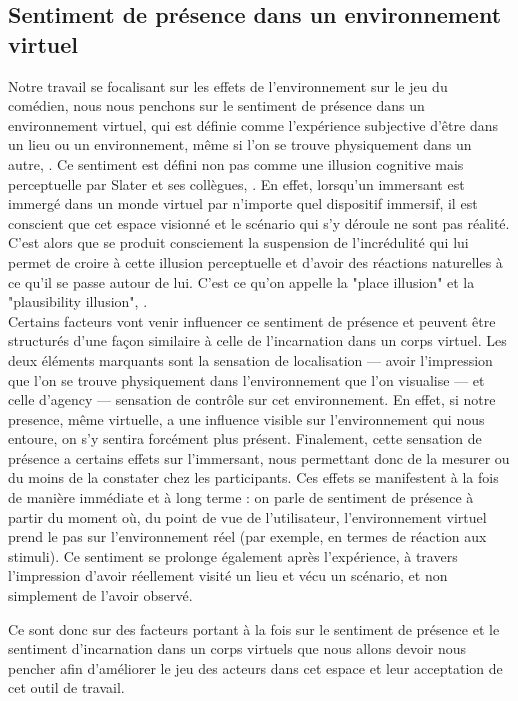\subsection{Sentiment de présence dans un environnement virtuel}
Notre travail se focalisant sur les effets de l'environnement sur le jeu du comédien, nous nous penchons sur le 
sentiment de présence dans un environnement virtuel, qui est définie comme l'expérience subjective d'être dans un lieu ou un environnement, 
même si l’on se trouve physiquement dans un autre, \cite{WitmerSinger1998PresenceQuestionnaire}.
Ce sentiment est défini non pas comme une illusion cognitive mais perceptuelle par 
Slater et ses collègues, \cite{Slater2018Immersion}. En effet, lorsqu'un immersant est immergé dans un monde virtuel
par n'importe quel dispositif immersif, il est conscient que cet espace visionné et le scénario qui s'y 
déroule ne sont pas réalité. C'est alors 
que se produit consciement la suspension de l'incrédulité qui lui permet de croire à cette illusion perceptuelle
et d'avoir des réactions naturelles à ce qu'il se passe autour de lui. C'est ce qu'on 
appelle la "place illusion" et la "plausibility illusion", \cite{Slater2009PlaceIllusion}. \\
Certains facteurs vont venir influencer ce sentiment de présence et peuvent être structurés d'une façon similaire à celle
de l'incarnation dans un corps virtuel. Les deux éléments marquants sont la sensation de localisation --- avoir l’impression que l’on
se trouve physiquement dans l’environnement que l’on visualise --- et celle d’agency --- sensation de contrôle
sur cet environnement. En effet, si notre presence, même virtuelle, a une influence visible sur l’environnement qui nous entoure,
on s’y sentira forcément plus présent. 
Finalement, cette sensation de présence a certains effets sur l'immersant, nous permettant donc de la mesurer ou du 
moins de la constater chez les participants. Ces effets se manifestent à la fois de manière immédiate et à long terme : on parle 
de sentiment de présence à partir du moment où, du point de vue de l’utilisateur, l’environnement virtuel prend le pas sur l’environnement réel
 (par exemple, en termes de réaction aux stimuli). Ce sentiment se prolonge également après l’expérience, à travers l’impression
  d’avoir réellement visité un lieu et vécu un scénario, et non simplement de l’avoir observé. 


  \vspace{\baselineskip}

Ce sont donc sur des facteurs portant à la fois sur le sentiment de présence et le sentiment d'incarnation dans 
un corps virtuels que nous allons devoir nous pencher afin d'améliorer le jeu des acteurs dans cet espace et leur acceptation
de cet outil de travail. 
